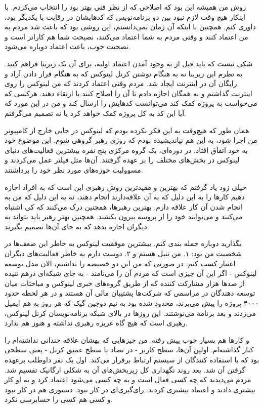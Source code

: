 روش من همیشه این بود که اصلاحی که از نظر فنی بهتر بود را انتخاب
می‌کردم. با اینکار هیچ وقت لازم نبود بین دو برنامه‌نویس که کدهایشان در
رقابت با یکدیگر بود، داوری کنم. همچنین با اینکه آن زمان نمی‌دانستم، این
روشی بود که باعث شد مردم به من اعتماد کنند و وقتی مردم به شما اعتماد
می‌کنند، نصیحت شما هم کاراتر است و نصحیت خوب، باعث اعتماد دوباره می‌شود.

شکی نیست که باید قبل از به وجود آمدن اعتماد اولیه، برای آن یک زیربنا
فراهم کنید. به نظرم این زیربنا نه به هنگام نوشتن کرنل لینوکس که به
هنگام قرار دادن آزاد و رایگان آن در اینترنت ایجاد شد. مردم وقتی اعتماد
کردند که من لینوکس را روی اینترنت گذاشتم و به همگان اجازه دادم تا آن
را اصلاح کنند یا ارتقاء دهند. هرکسی که می‌خواست به پروژه کمک کند
می‌توانست کدهایش را ارسال کند و من در این مورد که آیا این کد به کل
پروژه کمک خواهد کرد یا نه تصمیم می‌گرفتم.

همان طور که هیچ‌وقت به این فکر نکرده بودم که لینوکس در جایی خارج از
کامپیوتر من اجرا شود، به این هم نیاندیشیده بودم که روزی رهبر گروهی
شوم. این موضوع خود به خود اتفاق افتاد. در دوره‌ای، یک گروه مرکزی پنج
نفره بیشترین فعالیت‌های دنیای لینوکس در بخش‌های مختلف را بر عهده
گرفتند. آن‌ها مثل فیلتر عمل می‌کردند و مسوولیت حوزه‌های مورد نظر خود را
برداشتند.

خیلی زود یاد گرفتم که بهترین و مفیدترین روش رهبری این است که به افراد
اجازه دهیم کارها را به این دلیل که به آن علاقه‌دارند انجام دهند، نه به
این دلیل که من به انجام شدن آن کار علاقه دارم. بهترین رهبرها، همچنین
درک می‌کنند که کی اشتباه می‌کنند و می‌توانند خود را از پروسه بیرون
بکشند. همچنین بهتر رهبر باید بتواند به دیگران اجازه بدهد که به جای
آن‌ها تصمیم بگیرند.

بگذارید دوباره جمله بندی کنم. بیشترین موفقیت لینوکس به خاطر این ضعف‌ها
در شخصیت من بود: ۱. من تنبل هستم و ۲. دوست دارم به خاطر فعالیت‌های
دیگران اعتبار کسب کنم. در صورتی که من این دو خصیصه را نداشتم، الان مدل
توسعه لینوکس - اگر این آن چیزی است که مردم آن را می‌نامند - به جای
شبکه‌ای درهم تنیده از صدها هزار مشارکت کننده که از طریق گروه‌های خبری
لینوکس و مباحثات میان توسعه دهندگان در مراسمی که شرکت‌ها پشتیبان مالی
آن هستند و در هر لحظه حدود ۴۰۰۰ پروژه را پیش‌ می‌برند،‌ محدود شده بود به
نیم دوجین گیک که هر روز به هم ایمیل می‌زدند و بعد برنامه می‌نوشتند. این
روزها در بالای شبکه برنامه‌نویسان کرنل لینوکس، رهبری است که هیچ گاه
غریزه رهبری نداشته و هنوز هم ندارد.

و کارها هم بسیار خوب پیش رفته. من چیزهایی که بهشان علاقه چندانی
نداشته‌ام را کنار گذاشته‌ام. اولین آن‌ها، سطح کاربر - در تضاد با سطح عمیق
کرنل - یعنی سطحی بود که با استفاده کنندگان از سیستم ارتباط برقرار
می‌کند. اول یک نفر داوطلب برعهده گرفتن آن شد. بعد روند نگهداری کل
زیربخش‌های آن به شکلی ارگانیک تقسیم شد. مردم می‌دیدند که چه کسی فعال است
و به چه کسی می‌شود اعتماد کرد و به او کار بیشتری دادند و اعتماد بیشتری
کردند. رای‌گیری‌ای در کار نبود. دستوری هم در کار نبود و کسی هم کسی را
حسابرسی نکرد.

